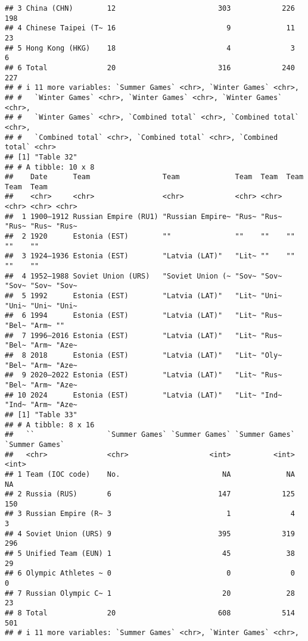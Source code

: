 \documentclass[
]{article}
\begin{document}
\begin{verbatim}
## 3 China (CHN)        12                        303            226            198
## 4 Chinese Taipei (T~ 16                          9             11             23
## 5 Hong Kong (HKG)    18                          4              3              6
## 6 Total              20                        316            240            227
## # i 11 more variables: `Summer Games` <chr>, `Winter Games` <chr>,
## #   `Winter Games` <chr>, `Winter Games` <chr>, `Winter Games` <chr>,
## #   `Winter Games` <chr>, `Combined total` <chr>, `Combined total` <chr>,
## #   `Combined total` <chr>, `Combined total` <chr>, `Combined total` <chr>
## [1] "Table 32"
## # A tibble: 10 x 8
##    Date      Team                 Team             Team  Team  Team  Team  Team 
##    <chr>     <chr>                <chr>            <chr> <chr> <chr> <chr> <chr>
##  1 1900–1912 Russian Empire (RU1) "Russian Empire~ "Rus~ "Rus~ "Rus~ "Rus~ "Rus~
##  2 1920      Estonia (EST)        ""               ""    ""    ""    ""    ""   
##  3 1924–1936 Estonia (EST)        "Latvia (LAT)"   "Lit~ ""    ""    ""    ""   
##  4 1952–1988 Soviet Union (URS)   "Soviet Union (~ "Sov~ "Sov~ "Sov~ "Sov~ "Sov~
##  5 1992      Estonia (EST)        "Latvia (LAT)"   "Lit~ "Uni~ "Uni~ "Uni~ "Uni~
##  6 1994      Estonia (EST)        "Latvia (LAT)"   "Lit~ "Rus~ "Bel~ "Arm~ ""   
##  7 1996–2016 Estonia (EST)        "Latvia (LAT)"   "Lit~ "Rus~ "Bel~ "Arm~ "Aze~
##  8 2018      Estonia (EST)        "Latvia (LAT)"   "Lit~ "Oly~ "Bel~ "Arm~ "Aze~
##  9 2020–2022 Estonia (EST)        "Latvia (LAT)"   "Lit~ "Rus~ "Bel~ "Arm~ "Aze~
## 10 2024      Estonia (EST)        "Latvia (LAT)"   "Lit~ "Ind~ "Ind~ "Arm~ "Aze~
## [1] "Table 33"
## # A tibble: 8 x 16
##   ``                 `Summer Games` `Summer Games` `Summer Games` `Summer Games`
##   <chr>              <chr>                   <int>          <int>          <int>
## 1 Team (IOC code)    No.                        NA             NA             NA
## 2 Russia (RUS)       6                         147            125            150
## 3 Russian Empire (R~ 3                           1              4              3
## 4 Soviet Union (URS) 9                         395            319            296
## 5 Unified Team (EUN) 1                          45             38             29
## 6 Olympic Athletes ~ 0                           0              0              0
## 7 Russian Olympic C~ 1                          20             28             23
## 8 Total              20                        608            514            501
## # i 11 more variables: `Summer Games` <chr>, `Winter Games` <chr>,

\end{verbatim}
\end{document}
